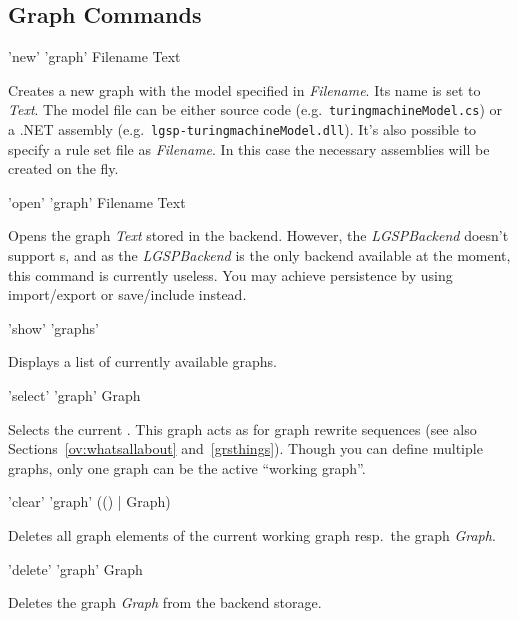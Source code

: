 \subsection{Graph Commands}
\label{graphcommands}

\begin{rail}
  'new' 'graph' Filename Text 
\end{rail}
Creates a new graph with the model specified in \emph{Filename}.
Its name is set to \emph{Text}. 
The model file can be either source code (e.g.\ \texttt{turing\textunderscore machineModel.cs}) or a .NET assembly (e.g.\ \texttt{lgsp-turing\textunderscore machineModel.dll}).
It's also possible to specify a rule set file as \emph{Filename}. 
In this case the necessary assemblies will be created on the fly.

\begin{rail}
  'open' 'graph' Filename Text
\end{rail}
Opens the graph \emph{Text} stored in the backend. 
However, the \emph{LGSPBackend} doesn't support s, and as the \emph{LGSPBackend} is the only backend available at the moment, this command is currently useless.
You may achieve persistence by using import/export or save/include instead.

\begin{rail}
  'show' 'graphs'
\end{rail}
Displays a list of currently available graphs.

\begin{rail}
  'select' 'graph' Graph
\end{rail}
Selects the current .
This graph acts as \emph{} for graph rewrite sequences (see also Sections~\ref{ov:whatsallabout} and~\ref{grsthings}).
Though you can define multiple graphs, only one graph can be the active ``working graph''.

\begin{rail}
  'clear' 'graph' (() | Graph)
\end{rail}
Deletes all graph elements of the current working graph resp.\ the graph \emph{Graph}.

\begin{rail}
  'delete' 'graph' Graph
\end{rail}
Deletes the graph \emph{Graph} from the backend storage.


